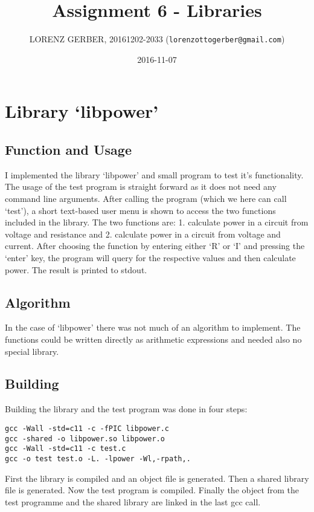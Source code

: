 \documentclass[a4paper,11pt,twoside]{article}
\title{Assignment 6 - Libraries}
\author{LORENZ GERBER, 20161202-2033 ({\tt{lorenzottogerber@gmail.com}})}
\date{2016-11-07}
\begin{document}
\lstset{language=C}
\maketitle
\thispagestyle{empty}
\newpage

\clearpage
{}

\section{Library `libpower'}
\subsection{Function and Usage}
I implemented the library `libpower' and small program to test it's functionality. The usage of the test program is straight forward as it does not need any command line arguments. After calling the program (which we here can call `test'), a short text-based user menu is shown to access the two functions included in the library. The two functions are: 1. calculate power in a circuit from voltage and resistance and 2. calculate power in a circuit from voltage and current. After choosing the function by entering either `R' or `I' and pressing the `enter' key, the program will query for the respective values and then calculate power. The result is printed to stdout.  

\subsection{Algorithm}
In the case of `libpower' there was not much of an algorithm to implement. The functions could be written directly as arithmetic expressions and needed also no special library.  

\subsection{Building}
Building the library and the test program was done in four steps:
\begin{verbatim}
gcc -Wall -std=c11 -c -fPIC libpower.c
gcc -shared -o libpower.so libpower.o
gcc -Wall -std=c11 -c test.c
gcc -o test test.o -L. -lpower -Wl,-rpath,.
\end{verbatim}
First the library is compiled and an object file is generated. Then a shared library file is generated. Now the test program is compiled. Finally the object from the test programme and the shared library are linked in the last gcc call. 
\end{document}
